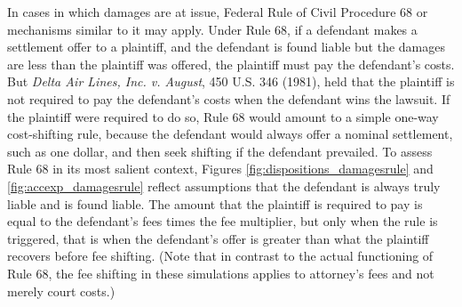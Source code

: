 \documentclass{article}
\begin{document}
In cases in which damages are at issue, Federal Rule of Civil Procedure 68 or mechanisms similar to it may apply. Under Rule 68, if a defendant makes a settlement offer to a plaintiff, and the defendant is found liable but the damages are less than the plaintiff was offered, the plaintiff must pay the defendant's costs. But \textit{Delta Air Lines, Inc. v. August}, 450 U.S. 346 (1981), held that the plaintiff is not required to pay the defendant's costs when the defendant wins the lawsuit. If the plaintiff were required to do so, Rule 68 would amount to a simple one-way cost-shifting rule, because the defendant would always offer a nominal settlement, such as one dollar, and then seek shifting if the defendant prevailed. To assess Rule 68 in its most salient context, Figures \ref{fig:dispositions_damagesrule} and \ref{fig:accexp_damagesrule} reflect assumptions that the defendant is always truly liable and is found liable. The amount that the plaintiff is required to pay is equal to the defendant's fees times the fee multiplier, but only when the rule is triggered, that is when the defendant's offer is greater than what the plaintiff recovers before fee shifting. (Note that in contrast to the actual functioning of Rule 68, the fee shifting in these simulations applies to attorney's fees and not merely court costs.)
\end{document}
